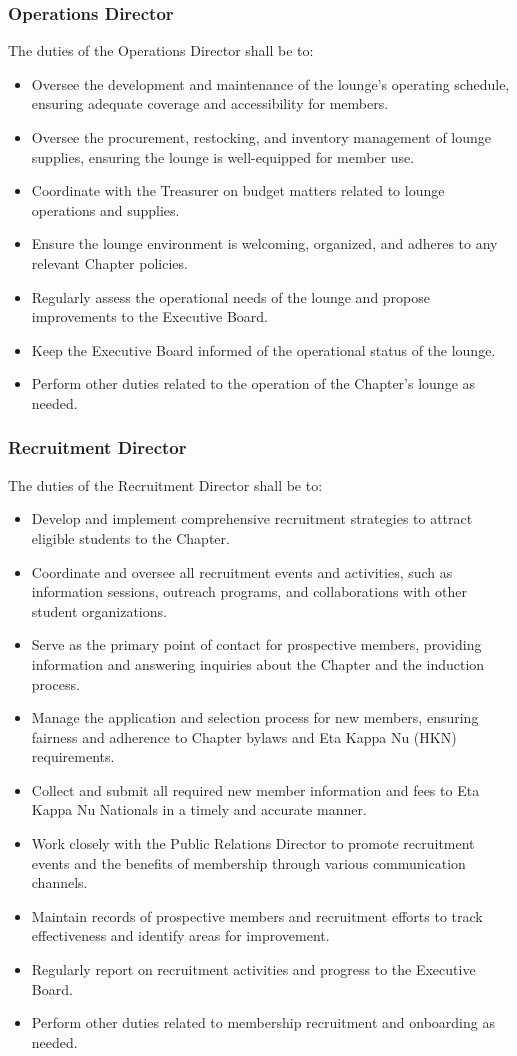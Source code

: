 \documentclass[10pt, oneside]{article}
\begin{document}
\subsubsection{Operations Director}
The duties of the Operations Director shall be to:
\begin{itemize}
    \item Oversee the development and maintenance of the lounge's operating schedule, ensuring adequate coverage and accessibility for members.
    \item Oversee the procurement, restocking, and inventory management of lounge supplies, ensuring the lounge is well-equipped for member use.
    \item Coordinate with the Treasurer on budget matters related to lounge operations and supplies.
    \item Ensure the lounge environment is welcoming, organized, and adheres to any relevant Chapter policies.
    \item Regularly assess the operational needs of the lounge and propose improvements to the Executive Board.
    \item Keep the Executive Board informed of the operational status of the lounge.
    \item Perform other duties related to the operation of the Chapter's lounge as needed.
\end{itemize}
\subsubsection{Recruitment Director}
The duties of the Recruitment Director shall be to:
\begin{itemize}
    \item Develop and implement comprehensive recruitment strategies to attract eligible students to the Chapter.
    \item Coordinate and oversee all recruitment events and activities, such as information sessions, outreach programs, and collaborations with other student organizations.
    \item Serve as the primary point of contact for prospective members, providing information and answering inquiries about the Chapter and the induction process.
    \item Manage the application and selection process for new members, ensuring fairness and adherence to Chapter bylaws and Eta Kappa Nu (HKN) requirements.
    \item Collect and submit all required new member information and fees to Eta Kappa Nu Nationals in a timely and accurate manner.
    \item Work closely with the Public Relations Director to promote recruitment events and the benefits of membership through various communication channels.
    \item Maintain records of prospective members and recruitment efforts to track effectiveness and identify areas for improvement.
    \item Regularly report on recruitment activities and progress to the Executive Board.
    \item Perform other duties related to membership recruitment and onboarding as needed.
\end{itemize}
\end{document}
